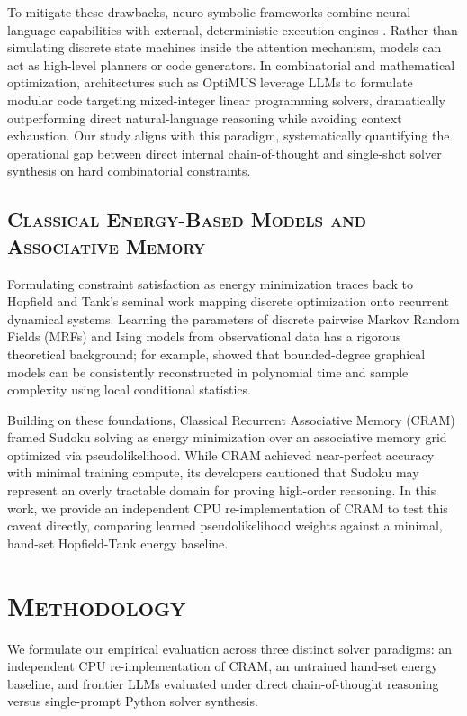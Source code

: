 \documentclass{article} %
\begin{document}
To mitigate these drawbacks, neuro-symbolic frameworks combine neural language capabilities with external, deterministic execution engines \citep{Yang2024NeurosymbolicArtificial}. Rather than simulating discrete state machines inside the attention mechanism, models can act as high-level planners or code generators. In combinatorial and mathematical optimization, architectures such as OptiMUS \citep{Ahmaditeshnizi2024OptimusScalable} leverage LLMs to formulate modular code targeting mixed-integer linear programming solvers, dramatically outperforming direct natural-language reasoning while avoiding context exhaustion. Our study aligns with this paradigm, systematically quantifying the operational gap between direct internal chain-of-thought and single-shot solver synthesis on hard combinatorial constraints.

\subsection{\textsc{Classical Energy-Based Models and Associative Memory}}
\label{subsec:energy_models}
Formulating constraint satisfaction as energy minimization traces back to Hopfield and Tank's seminal work mapping discrete optimization onto recurrent dynamical systems. Learning the parameters of discrete pairwise Markov Random Fields (MRFs) and Ising models from observational data has a rigorous theoretical background; for example, \citet{Bresler2014EfficientlyLearning} showed that bounded-degree graphical models can be consistently reconstructed in polynomial time and sample complexity using local conditional statistics.

Building on these foundations, Classical Recurrent Associative Memory (CRAM) framed Sudoku solving as energy minimization over an associative memory grid optimized via pseudolikelihood. While CRAM achieved near-perfect accuracy with minimal training compute, its developers cautioned that Sudoku may represent an overly tractable domain for proving high-order reasoning. In this work, we provide an independent CPU re-implementation of CRAM to test this caveat directly, comparing learned pseudolikelihood weights against a minimal, hand-set Hopfield-Tank energy baseline.

\section{\textsc{Methodology}}
\label{sec:method}

We formulate our empirical evaluation across three distinct solver paradigms: an independent CPU re-implementation of CRAM, an untrained hand-set energy baseline, and frontier LLMs evaluated under direct chain-of-thought reasoning versus single-prompt Python solver synthesis.
\end{document}
